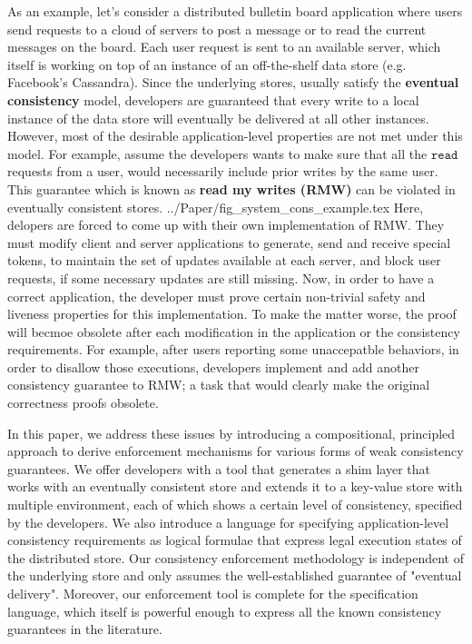 As an example, let's consider a distributed bulletin board application where users
send requests to a cloud of servers to post a message or to read the current
messages on the board. Each user request is sent to an available server,
which itself is working on top of an instance of an off-the-shelf data
store (e.g. Facebook's Cassandra). 
Since the underlying stores, usually satisfy the {\bf eventual consistency} model, 
developers are guaranteed  that every write to a local instance of the data 
store will eventually  be delivered at all other instances. However, 
most of the desirable application-level properties are not met under this model.          
For example, assume the developers wants to make sure that all the
$\mathtt{read}$ requests from
a user, would necessarily include prior writes by the same user.  This
guarantee which is known as {\bf read my writes (RMW)} can be violated in
eventually consistent stores.  
 {../Paper/fig_system_cons_example.tex}
Here, delopers are forced to come up with their own implementation of
RMW. They must modify client and server applications to generate, send
and receive special tokens, to maintain the set of updates available at
each server, and block user requests, if some necessary updates are
still missing. Now, in order to have a correct application, the
developer must prove certain non-trivial safety and liveness
properties for this implementation. To make the matter worse, the
proof will becmoe obsolete after each modification in the application or
the consistency requirements. For example, after users reporting some unaccepatble
behaviors, in order to disallow those executions, developers 
implement and add another consistency guarantee to RMW; a task that
would clearly make the original correctness proofs obsolete. 




In this paper, we address these issues by introducing a compositional, principled approach to 
derive enforcement mechanisms for various forms of weak consistency 
guarantees. 
We offer developers with a tool that generates a shim layer that works
with an eventually consistent store and extends it to a key-value store
with multiple environment, each of which shows a certain level of
consistency, specified by the developers. 
We also introduce a language for specifying application-level consistency 
requirements as logical formulae that express legal execution states of the distributed store. 
Our consistency enforcement methodology is independent of the underlying store 
and only assumes the well-established guarantee of "eventual delivery". 
Moreover, our enforcement tool is complete for the specification
language, which itself is powerful enough to express all the known consistency 
guarantees in the literature.


